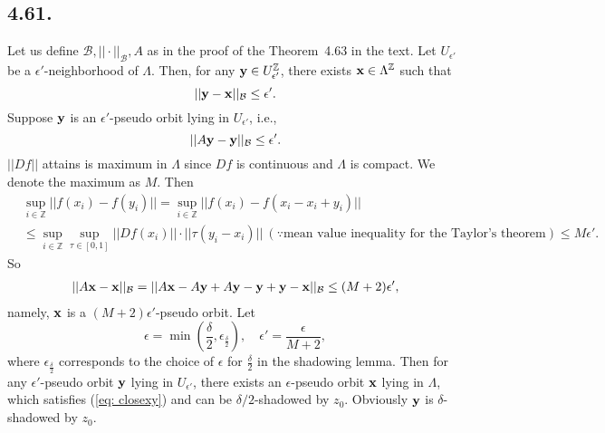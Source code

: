 \documentclass[a4paper,11pt,fleqn]{article}
\begin{document}
\maketitle
\subsection{4.61.}
Let us define $\mathcal{B}, ||\cdot||_{\mathcal{B}}, A$ as in the proof of the Theorem~4.63 in the text. Let $U_{\epsilon'}$ be a $\epsilon'$-neighborhood of $\Lambda$. Then, for any ${\bf y} \in U_{\epsilon'}^{\mathbb{Z}}$, there exists ${\bf x} \in \Lambda^{\mathbb{Z}}$ such that
\begin{equation}
    ||{\bf y}-{\bf x}||_{\mathcal{B}} \le \epsilon'. \label{eq: closexy}
\end{equation} 
Suppose ${\bf y}$ is an $\epsilon'$-pseudo orbit lying in $U_{\epsilon'}$, i.e.,
\begin{equation}
    ||A{\bf y}-{\bf y}||_{\mathcal{B}} \le \epsilon'.
\end{equation}
$||Df||$ attains is maximum in $\Lambda$ since $Df$ is continuous and $\Lambda$ is compact. We denote the maximum as $M$. Then 
\begin{align}
    &\sup_{i\in\mathbb{Z}}{||f(x_i)-f(y_i)||} = \sup_{i\in\mathbb{Z}}{||f(x_i)-f(x_i-x_i+y_i)||} \nonumber \\
    &\le \sup_{i\in\mathbb{Z}}\sup_{\tau\in[0,1]}||Df(x_i)||\cdot||\tau(y_i-x_i)|| \ (\because \text{mean value inequality for the Taylor's theorem}) \le M\epsilon'. 
\end{align}
So 
\begin{align}
    ||A{\bf x}-{\bf x}||_{\mathcal{B}} = ||A{\bf x}-A{\bf y}+A{\bf y}-{\bf y}+{\bf y}-{\bf x}||_{\mathcal{B}} \le (M+2)\epsilon',  
\end{align}
namely, ${\bf x}$ is a $(M+2)\epsilon'$-pseudo orbit. 
Let 
\begin{equation}
    \epsilon = \min{\left(\frac{\delta }{2},\epsilon_{\frac{\delta}{2}}\right)},\quad \epsilon' = \frac{\epsilon}{M+2}, 
\end{equation}
where $\epsilon_{\frac{\delta}{2}}$ corresponds to the choice of $\epsilon$ for $\frac{\delta}{2}$ in the shadowing lemma. Then for any $\epsilon'$-pseudo orbit ${\bf y}$ lying in $U_{\epsilon'}$, there exists an $\epsilon$-pseudo orbit ${\bf x}$ lying in $\Lambda$, which satisfies (\ref{eq: closexy}) and can be $\delta/2$-shadowed by $z_0$. Obviously ${\bf y}$ is $\delta$-shadowed by $z_0$.  
\hruleskip
\end{document}
